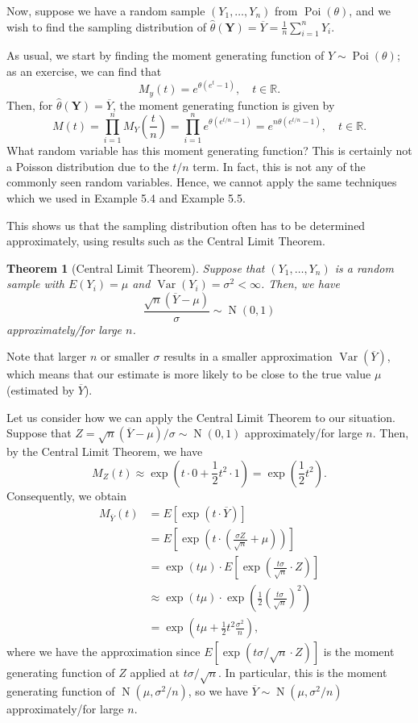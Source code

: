 \documentclass[10pt]{article}
\newcommand{\R}{\mathbb{R}}
\DeclareMathOperator{\Poi}{Poi}
\DeclareMathOperator{\Nor}{N}
\DeclareMathOperator{\Var}{Var}
\theoremstyle{newstyle}
\newtheorem{thm}{Theorem}[section]
\begin{document}
\vspace{-3ex}
Now, suppose we have a random sample $(Y_1, \dots, Y_n)$ from $\Poi(\theta)$, and we wish to 
find the sampling distribution of $\hat\theta(\mathbf Y) = \overline Y = \frac1n \sum_{i=1}^n Y_i$. 

As usual, we start by finding the moment generating function of $Y \sim \Poi(\theta)$; as 
an exercise, we can find that 
\[ M_y(t) = e^{\theta(e^t-1)}, \quad t \in \R. \] 
Then, for $\hat\theta(\mathbf Y) = \overline Y$, the moment generating function is given by 
\[ M(t) = \prod_{i=1}^n M_Y \left( \frac tn \right) = \prod_{i=1}^n e^{\theta(e^{t/n}-1)} 
= e^{n\theta(e^{t/n}-1)}, \quad t \in \R. \]
What random variable has this moment generating function? This is certainly not a Poisson distribution 
due to the $t/n$ term. In fact, this is not any of the commonly seen random variables. Hence, 
we cannot apply the same techniques which we used in Example 5.4 and Example 5.5.

This shows us that the sampling distribution often has to be determined approximately, using 
results such as the Central Limit Theorem. 

\begin{thm}[Central Limit Theorem]
Suppose that $(Y_1, \dots, Y_n)$ is a random sample with $E(Y_i) = \mu$ and 
$\Var(Y_i) = \sigma^2 < \infty$. Then, we have 
\[ \frac{\sqrt n (\overline Y - \mu)}{\sigma} \sim \Nor(0, 1) \]
approximately/for large $n$.
\end{thm}

Note that larger $n$ or smaller $\sigma$ results in a smaller approximation 
$\Var(\overline Y)$, which means that our estimate is more likely to be close to the true value 
$\mu$ (estimated by $\overline Y$).

Let us consider how we can apply the Central Limit Theorem to our situation. 
Suppose that $Z = \sqrt n(\overline Y - \mu)/\sigma \sim \Nor(0, 1)$ approximately/for large $n$. 
Then, by the Central Limit Theorem, we have
\[ M_Z(t) \approx \exp \left(t \cdot 0 + \frac12 t^2 \cdot 1 \right) = \exp \left( \frac12 t^2 \right). \]
Consequently, we obtain 
\begin{align*}
    M_{\overline Y}(t) &= E[\exp(t \cdot \overline Y)] \\
    &= E \left[ \exp \left( t \cdot \left( \frac{\sigma Z}{\sqrt n} + \mu \right) \right) \right] \\
    &= \exp(t\mu) \cdot E \left[ \exp \left( \frac{t\sigma}{\sqrt n} \cdot Z \right) \right] \\
    &\approx \exp(t\mu) \cdot \exp \left( \frac12 \left( \frac{t\sigma}{\sqrt n} \right)^2 \right) \\
    &= \exp \left( t\mu + \frac12 t^2 \frac{\sigma^2}n \right),
\end{align*}
where we have the approximation since $E [ \exp(t\sigma / \sqrt n \cdot Z)]$ is the moment 
generating function of $Z$ applied at $t\sigma / \sqrt n$. In particular, this is the 
moment generating function of $\Nor(\mu, \sigma^2/n)$, so we have 
$\overline Y \sim \Nor(\mu, \sigma^2/n)$ approximately/for large $n$. 
\end{document}
